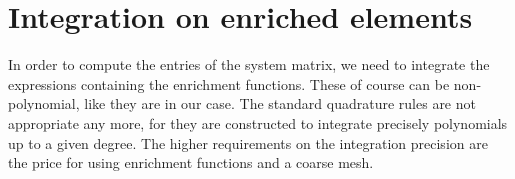 \documentclass{elsarticle}
\begin{document}
% 
% 


\section{Integration on enriched elements}
\label{sec:integration}
In order to compute the entries of the system matrix, %
we need to integrate
the expressions containing the enrichment functions. These of course can be non-polynomial, like they are 
in our case. The standard quadrature rules are not appropriate any more, for they are constructed to integrate 
precisely polynomials up to a given degree. The higher requirements on the integration precision
are the price for using enrichment functions and a coarse mesh.
\end{document}
